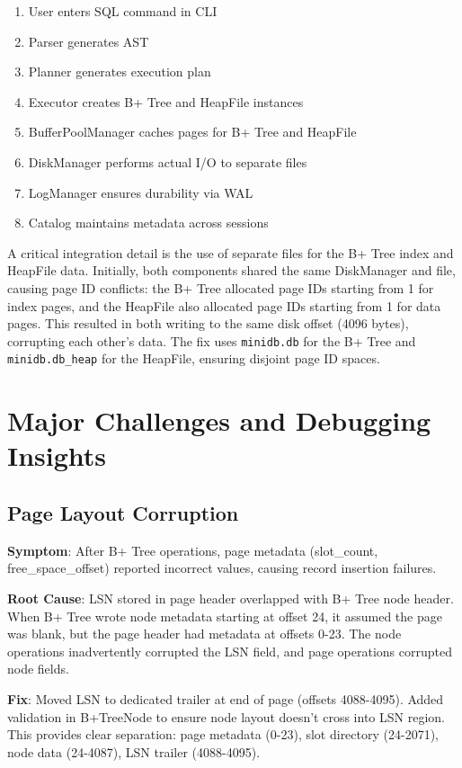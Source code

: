 \documentclass{article}
\begin{document}
\begin{enumerate}
    \item User enters SQL command in CLI
    \item Parser generates AST
    \item Planner generates execution plan
    \item Executor creates B+ Tree and HeapFile instances
    \item BufferPoolManager caches pages for B+ Tree and HeapFile
    \item DiskManager performs actual I/O to separate files
    \item LogManager ensures durability via WAL
    \item Catalog maintains metadata across sessions
\end{enumerate}

A critical integration detail is the use of separate files for the B+ Tree index and HeapFile data. Initially, both components shared the same DiskManager and file, causing page ID conflicts: the B+ Tree allocated page IDs starting from 1 for index pages, and the HeapFile also allocated page IDs starting from 1 for data pages. This resulted in both writing to the same disk offset (4096 bytes), corrupting each other's data. The fix uses \texttt{minidb.db} for the B+ Tree and \texttt{minidb.db\_heap} for the HeapFile, ensuring disjoint page ID spaces.

\section{Major Challenges and Debugging Insights}

\subsection{Page Layout Corruption}

\textbf{Symptom}: After B+ Tree operations, page metadata (slot\_count, free\_space\_offset) reported incorrect values, causing record insertion failures.

\textbf{Root Cause}: LSN stored in page header overlapped with B+ Tree node header. When B+ Tree wrote node metadata starting at offset 24, it assumed the page was blank, but the page header had metadata at offsets 0-23. The node operations inadvertently corrupted the LSN field, and page operations corrupted node fields.

\textbf{Fix}: Moved LSN to dedicated trailer at end of page (offsets 4088-4095). Added validation in B+TreeNode to ensure node layout doesn't cross into LSN region. This provides clear separation: page metadata (0-23), slot directory (24-2071), node data (24-4087), LSN trailer (4088-4095).
\end{document}
